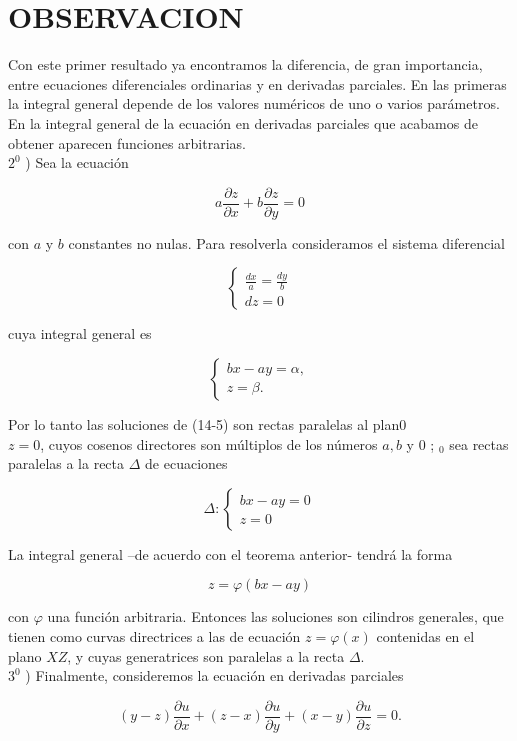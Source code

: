\documentclass[10pt]{article}
\theoremstyle{plain}
\theoremstyle{definition}
\theoremstyle{remark}
\begin{document}
\section*{OBSERVACION}
Con este primer resultado ya encontramos la diferencia, de gran importancia, entre ecuaciones diferenciales ordinarias y en derivadas parciales. En las primeras la integral general depende de los valores numéricos de uno o varios parámetros. En la integral general de la ecuación en derivadas parciales que acabamos de obtener aparecen funciones arbitrarias.\\
$2^{0}$ ) Sea la ecuación

$$
a \frac{\partial z}{\partial x}+b \frac{\partial z}{\partial y}=0
$$

con $a$ y $b$ constantes no nulas. Para resolverla consideramos el sistema diferencial

$$
\left\{\begin{array}{l}
\frac{d x}{a}=\frac{d y}{b} \\
d z=0
\end{array}\right.
$$

cuya integral general es

$$
\left\{\begin{array}{l}
b x-a y=\alpha, \\
z=\beta .
\end{array}\right.
$$

Por lo tanto las soluciones de (14-5) son rectas paralelas al plan0\\
$z=0$, cuyos cosenos directores son múltiplos de los números $a, b$ y 0 ; ${ }_{0}$ sea rectas paralelas a la recta $\Delta$ de ecuaciones

$$
\Delta:\left\{\begin{array}{l}
b x-a y=0 \\
z=0
\end{array}\right.
$$

La integral general --de acuerdo con el teorema anterior- tendrá la forma

$$
z=\varphi(b x-a y)
$$

con $\varphi$ una función arbitraria. Entonces las soluciones son cilindros generales, que tienen como curvas directrices a las de ecuación $z=\varphi(x)$ contenidas en el plano $X Z$, y cuyas generatrices son paralelas a la recta $\Delta$.\\
$3^{0}$ ) Finalmente, consideremos la ecuación en derivadas parciales


\begin{equation*}
(y-z) \frac{\partial u}{\partial x}+(z-x) \frac{\partial u}{\partial y}+(x-y) \frac{\partial u}{\partial z}=0 . \tag{14-11}
\end{equation*}
\end{document}
